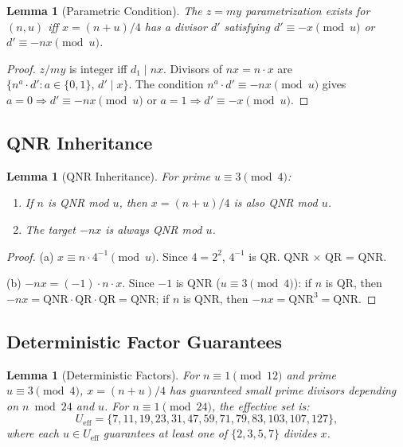 \documentclass[11pt,a4paper]{article}
\theoremstyle{plain}
\newtheorem{lemma}[theorem]{Lemma}
\theoremstyle{definition}
\begin{document}
\begin{lemma}[Parametric Condition]
\label{lem:parametric}
The $z = my$ parametrization exists for $(n, u)$ iff $x = (n+u)/4$ has a divisor $d'$ satisfying $d' \equiv -x \pmod{u}$ or $d' \equiv -nx \pmod{u}$.
\end{lemma}

\begin{proof}
$z/my$ is integer iff $d_1 \mid nx$. Divisors of $nx = n \cdot x$ are $\{n^a \cdot d' : a \in \{0,1\},\, d' \mid x\}$. The condition $n^a \cdot d' \equiv -nx \pmod{u}$ gives $a = 0 \Rightarrow d' \equiv -nx \pmod{u}$ or $a = 1 \Rightarrow d' \equiv -x \pmod{u}$.
\end{proof}

\subsection{QNR Inheritance}

\begin{lemma}[QNR Inheritance]
\label{lem:qnr}
For prime $u \equiv 3 \pmod{4}$:
\begin{enumerate}[label=(\alph*)]
\item If $n$ is QNR mod $u$, then $x = (n+u)/4$ is also QNR mod $u$.
\item The target $-nx$ is always QNR mod $u$.
\end{enumerate}
\end{lemma}

\begin{proof}
(a) $x \equiv n \cdot 4^{-1} \pmod{u}$. Since $4 = 2^2$, $4^{-1}$ is QR. QNR $\times$ QR = QNR.

(b) $-nx = (-1) \cdot n \cdot x$. Since $-1$ is QNR ($u \equiv 3 \pmod 4$): if $n$ is QR, then $-nx = \text{QNR} \cdot \text{QR} \cdot \text{QR} = \text{QNR}$; if $n$ is QNR, then $-nx = \text{QNR}^3 = \text{QNR}$.
\end{proof}

\subsection{Deterministic Factor Guarantees}

\begin{lemma}[Deterministic Factors]
\label{lem:detfactors}
For $n \equiv 1 \pmod{12}$ and prime $u \equiv 3 \pmod 4$, $x = (n+u)/4$ has guaranteed small prime divisors depending on $n \bmod 24$ and $u$. For $n \equiv 1 \pmod{24}$, the effective set is:
\[
U_{\mathrm{eff}} = \{7, 11, 19, 23, 31, 47, 59, 71, 79, 83, 103, 107, 127\},
\]
where each $u \in U_{\mathrm{eff}}$ guarantees at least one of $\{2, 3, 5, 7\}$ divides $x$.
\end{lemma}
\end{document}
